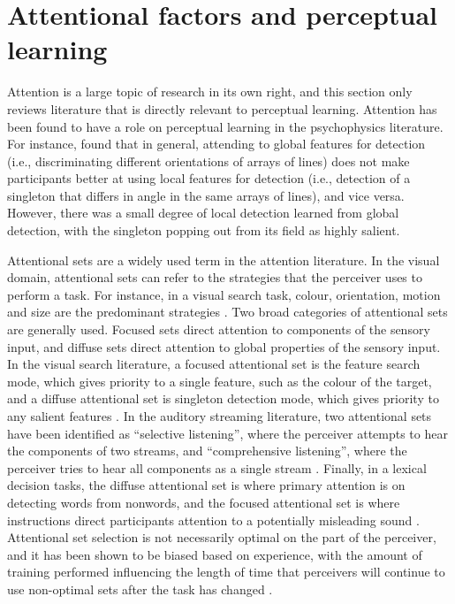 \section{Attentional factors and perceptual learning}
\label{sec:attention}

Attention is a large topic of research in its own right, and this section only reviews literature that is directly relevant to perceptual learning.
Attention has been found to have a role on perceptual learning in the psychophysics literature.  
For instance, \citet{Ahissar1993} found that in general, attending to global features for detection (i.e., discriminating different orientations of arrays of lines) does not make participants better at using local features for detection (i.e., detection of a singleton that differs in angle in the same arrays of lines), and vice versa.  However, there was a small degree of local detection learned from global detection, with the singleton popping out from its field as highly salient.

Attentional sets are a widely used term in the attention literature.  
In the visual domain, attentional sets can refer to the strategies that the perceiver uses to perform a task.  
For instance, in a visual search task, colour, orientation, motion and size are the predominant strategies \citep{Wolfe2004}.  
Two broad categories of attentional sets are generally used.  
Focused sets direct attention to components of the sensory input, and diffuse sets direct attention to global properties of the sensory input.  
In the visual search literature, a focused attentional set is the feature search mode, which gives priority to a single feature, such as the colour of the target, and a diffuse attentional set is singleton detection mode, which gives priority to any salient features \citep{Bacon1994}. 
In the auditory streaming literature, two attentional sets have been identified as ``selective listening'', where the perceiver attempts to hear the components of two streams, and ``comprehensive listening'', where the perceiver tries to hear all components as a single stream  \citep{vanNoorden1975}.
Finally, in a lexical decision tasks, the diffuse attentional set is where primary attention is on detecting words from nonwords, and the focused attentional set is where instructions direct participants attention to a potentially misleading sound \citep{Pitt2012}.
Attentional set selection is not necessarily optimal on the part of the perceiver, and it has been shown to be biased based on experience, with the amount of training performed influencing the length of time that perceivers will continue to use non-optimal sets after the task has changed \citep{Leber2006}.  

